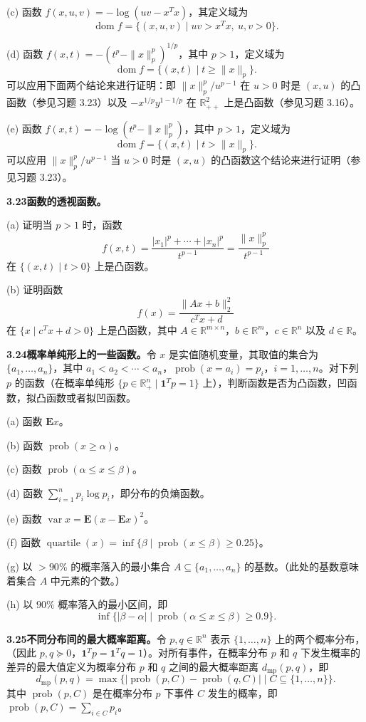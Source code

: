 \documentclass[UTF8, 12pt, fontset=fandol, oneside]{ctexart}
\DeclareMathOperator{\dom}{dom}
\begin{document}
(c) 函数 $f(x,u,v)=-\log(uv-x^Tx)$，其定义域为
\[
\dom f=\{(x,u,v)\mid uv>x^Tx,\ u,v>0\}.
\]

(d) 函数 $f(x,t)=-(t^p-\|x\|_p^p)^{1/p}$，其中 $p>1$，定义域为
\[
\dom f=\{(x,t)\mid t\geq\|x\|_p\}.
\]
可以应用下面两个结论来进行证明：即 $\|x\|_p^p/u^{p-1}$ 在 $u>0$ 时是 $(x,u)$ 的凸函数（参见习题 3.23）以及 $-x^{1/p}y^{1-1/p}$ 在 $\mathbb{R}_{++}^2$ 上是凸函数（参见习题 3.16）。

(e) 函数 $f(x,t)=-\log(t^p-\|x\|_p^p)$，其中 $p>1$，定义域为
\[
\dom f=\{(x,t)\mid t>\|x\|_p\}.
\]
可以应用 $\|x\|_p^p/u^{p-1}$ 当 $u>0$ 时是 $(x,u)$ 的凸函数这个结论来进行证明（参见习题 3.23）。

\noindent\textbf{3.23\quad 函数的透视函数。}

(a) 证明当 $p>1$ 时，函数
\[
f(x,t)=\frac{|x_1|^p+\cdots+|x_n|^p}{t^{p-1}}=\frac{\|x\|_p^p}{t^{p-1}}
\]
在 $\{(x,t)\mid t>0\}$ 上是凸函数。

(b) 证明函数
\[
f(x)=\frac{\|Ax+b\|_2^2}{c^Tx+d}
\]
在 $\{x\mid c^Tx+d>0\}$ 上是凸函数，其中 $A\in\mathbb{R}^{m\times n}$，$b\in\mathbb{R}^m$，$c\in\mathbb{R}^n$ 以及 $d\in\mathbb{R}$。

\noindent\textbf{3.24\quad 概率单纯形上的一些函数。}\quad 令 $x$ 是实值随机变量，其取值的集合为 $\{a_1,\ldots,a_n\}$，其中 $a_1<a_2<\cdots<a_n$，$\operatorname{prob}(x=a_i)=p_i$，$i=1,\ldots,n$。对下列 $p$ 的函数（在概率单纯形 $\{p\in\mathbb{R}_+^n\mid \mathbf{1}^Tp=1\}$ 上），判断函数是否为凸函数，凹函数，拟凸函数或者拟凹函数。

(a) 函数 $\mathbf{E}x$。

(b) 函数 $\operatorname{prob}(x\geq\alpha)$。

(c) 函数 $\operatorname{prob}(\alpha\leq x\leq\beta)$。

(d) 函数 $\sum_{i=1}^n p_i\log p_i$，即分布的负熵函数。

(e) 函数 $\operatorname{var}x=\mathbf{E}(x-\mathbf{E}x)^2$。

(f) 函数 $\operatorname{quartile}(x)=\inf\{\beta\mid \operatorname{prob}(x\leq\beta)\geq0.25\}$。

(g) 以 $>90\%$ 的概率落入的最小集合 $A\subseteq\{a_1,\ldots,a_n\}$ 的基数。（此处的基数意味着集合 $A$ 中元素的个数。）

(h) 以 $90\%$ 概率落入的最小区间，即
\[
\inf\{|\beta-\alpha|\mid \operatorname{prob}(\alpha\leq x\leq\beta)\geq0.9\}.
\]

\noindent\textbf{3.25\quad 不同分布间的最大概率距离。}\quad 令 $p,q\in\mathbb{R}^n$ 表示 $\{1,\ldots,n\}$ 上的两个概率分布，（因此 $p,q\succeq0$，$\mathbf{1}^Tp=\mathbf{1}^Tq=1$）。对所有事件，在概率分布 $p$ 和 $q$ 下发生概率的差异的最大值定义为概率分布 $p$ 和 $q$ 之间的最大概率距离 $d_{\mathrm{mp}}(p,q)$，即
\[
d_{\mathrm{mp}}(p,q)=\max\{|\operatorname{prob}(p,C)-\operatorname{prob}(q,C)|\mid C\subseteq\{1,\ldots,n\}\}.
\]
其中 $\operatorname{prob}(p,C)$ 是在概率分布 $p$ 下事件 $C$ 发生的概率，即 $\operatorname{prob}(p,C)=\sum_{i\in C}p_i$。
\end{document}
